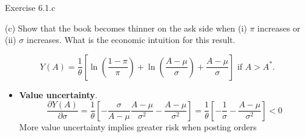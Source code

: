 \documentclass[english,10pt
,aspectratio=169
]{beamer}
\begin{document}
\begin{frame}{Exercise 6.1.c}
	\begin{exampleblock}{}
		(c) Show that the book becomes thinner on the ask side when (i) $\pi$ increases or (ii) $\sigma$ increases. What is the economic intuition for this result.
	\end{exampleblock}

	$$
		Y(A)=\frac{1}{\theta} \left[\ln \left(\frac{1-\pi}{\pi}\right) + \ln \left(\frac{A-\mu}{\sigma}\right) + \frac{A-\mu}{\sigma}\right]\text{ if } A>A^*.
	$$
	
	\begin{itemize}
		\item \textbf{Value uncertainty}. 
		\[
		\frac{\partial Y(A)}{\partial \sigma} = \frac{1}{\theta} \left[ -\frac{\sigma}{A-\mu}\frac{A-\mu}{\sigma^2} - \frac{A-\mu}{\sigma^2}\right]=\frac{1}{\theta} \left[ -\frac{1}{\sigma} - \frac{A-\mu}{\sigma^2}\right]<0
		\]
		More value uncertainty implies greater risk when posting orders
	\end{itemize}
\end{frame}
\end{document}
